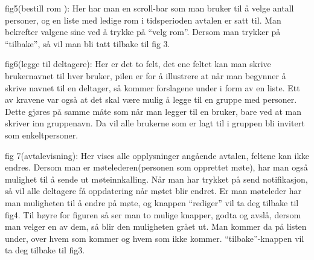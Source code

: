 fig5(bestill rom ):
Her har man en scroll-bar som man bruker til å velge antall personer, og en liste med ledige rom i tidsperioden avtalen er satt til. Man bekrefter valgene sine ved å trykke på “velg rom”. Dersom man trykker på “tilbake”, så vil man bli tatt tilbake til fig 3.

fig6(legge til deltagere):
Her er det to felt, det ene feltet kan man skrive brukernavnet til hver bruker, pilen er for å illustrere at når man begynner å skrive navnet til en deltager, så kommer forslagene under i form av en liste. Ett av kravene var også at det skal være mulig å legge til en gruppe med personer. Dette gjøres på samme måte som når man legger til en bruker, bare ved at man skriver inn gruppenavn. Da vil alle brukerne som er lagt til i gruppen bli invitert som enkeltpersoner.

fig 7(avtalevisning):
Her vises alle opplysninger angående avtalen, feltene kan ikke endres. Dersom man er møtelederen(personen som opprettet møte), har man også mulighet til å sende ut møteinnkalling. Når man har trykket på send notifikasjon, så vil alle deltagere få oppdatering når møtet blir endret. Er man møteleder har man muligheten til å endre på møte, og knappen “rediger” vil ta deg tilbake til fig4. Til høyre for figuren så ser man to mulige knapper, godta og avslå, dersom man velger en av dem, så blir den muligheten grået ut. Man kommer da på listen under, over hvem som kommer og hvem som ikke kommer. “tilbake”-knappen vil ta deg tilbake til fig3.